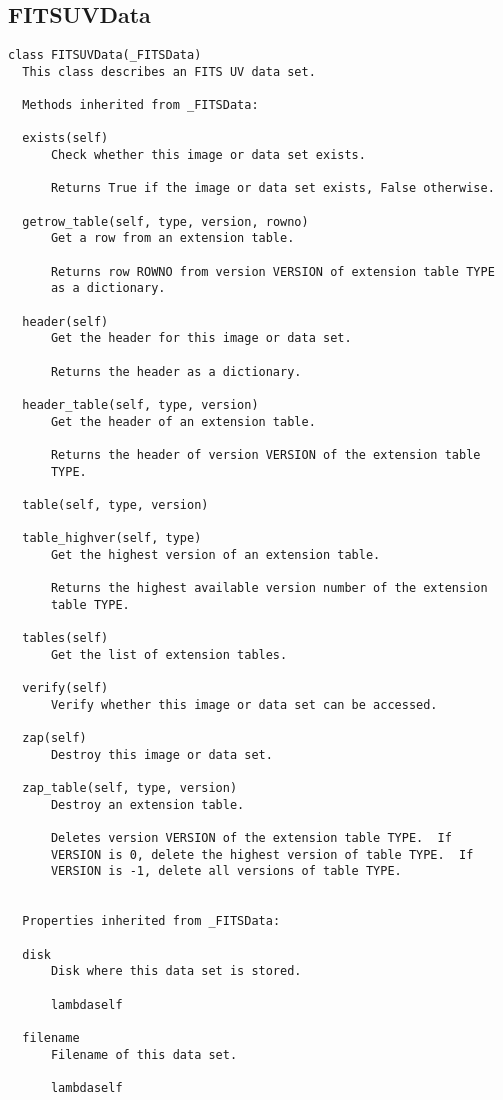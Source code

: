 \documentclass[11pt]{report}
\begin{document}
\subsection{FITSUVData}
\begin{verbatim}
class FITSUVData(_FITSData)
  This class describes an FITS UV data set.
  
  Methods inherited from _FITSData:
  
  exists(self)
      Check whether this image or data set exists.
      
      Returns True if the image or data set exists, False otherwise.
  
  getrow_table(self, type, version, rowno)
      Get a row from an extension table.
      
      Returns row ROWNO from version VERSION of extension table TYPE
      as a dictionary.
  
  header(self)
      Get the header for this image or data set.
      
      Returns the header as a dictionary.
  
  header_table(self, type, version)
      Get the header of an extension table.
      
      Returns the header of version VERSION of the extension table
      TYPE.
  
  table(self, type, version)
  
  table_highver(self, type)
      Get the highest version of an extension table.
      
      Returns the highest available version number of the extension
      table TYPE.
  
  tables(self)
      Get the list of extension tables.
  
  verify(self)
      Verify whether this image or data set can be accessed.
  
  zap(self)
      Destroy this image or data set.
  
  zap_table(self, type, version)
      Destroy an extension table.
      
      Deletes version VERSION of the extension table TYPE.  If
      VERSION is 0, delete the highest version of table TYPE.  If
      VERSION is -1, delete all versions of table TYPE.
  

  Properties inherited from _FITSData:
  
  disk
      Disk where this data set is stored.
  
      lambdaself
  
  filename
      Filename of this data set.
  
      lambdaself
\end{verbatim}
\end{document}
